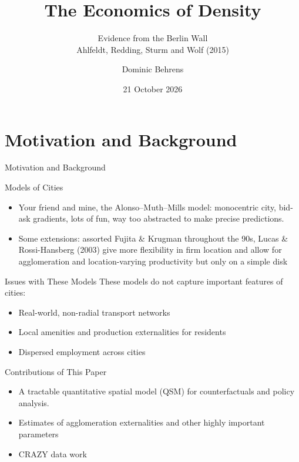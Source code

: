 \documentclass[aspectratio=169,11pt]{beamer}
\title{The Economics of Density}
\subtitle{Evidence from the Berlin Wall\\[0.5em]
  \small Ahlfeldt, Redding, Sturm and Wolf (2015)}
\author[Dominic Behrens]{Dominic Behrens}
\institute{The Centre for International Economics}
\date{21 October 2026}
\newcommand{\decksection}[1]{%
  \section{#1}
  \begin{frame}[plain]
    \vfill{\usebeamerfont{title}\color{navy}\LARGE #1}\vfill
  \end{frame}}
\begin{document}
\begin{frame}[plain]
  \titlepage
\end{frame}
\decksection{Motivation and Background}
\begin{frame}{Models of Cities}
  \begin{itemize}\setlength{\itemsep}{1.2em}
    \item Your friend and mine, the Alonso--Muth--Mills model: monocentric city, bid-ask gradients, lots of fun, way too abstracted to make precise predictions. 
    \item Some extensions: assorted Fujita \& Krugman throughout the 90s, Lucas \& Rossi-Hansberg (2003) give more flexibility in firm location and allow for agglomeration and location-varying productivity but only on a simple disk  
  \end{itemize}
\end{frame}
\begin{frame}{Issues with These Models}
  These models do not capture important features of cities:
  \vspace{0.7em}
  \begin{itemize}\setlength{\itemsep}{1.0em}
    \item Real-world, non-radial transport networks
    \item Local amenities and production externalities for residents
    \item Dispersed employment across cities
  \end{itemize}
\end{frame}
\begin{frame}{Contributions of This Paper}
  \begin{itemize}\setlength{\itemsep}{1.2em}
    \item A tractable quantitative spatial model (QSM) for counterfactuals
      and policy analysis.
    \item Estimates of agglomeration externalities and other highly important parameters 
    \item CRAZY data work
  \end{itemize}
\end{frame}
\end{document}
